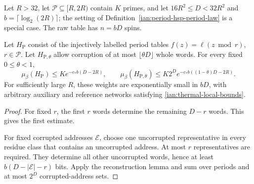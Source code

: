 \begin{proposition}
\label{ian:thermal-period-raw-obstruction}
Let \(R>32\), let \(\mathcal P\subseteq[R,2R)\) contain \(K\) primes,
and let
\(16R^2\le D<32R^2\) and \(b=\lceil\log_2(2R)\rceil\); the setting of
Definition~\ref{ian:period-hsp-period-law} is a special case.
The raw table has \(n=bD\) spins.

Let \(H_{\mathrm P}\) consist of the injectively labelled period
tables \(f(z)=\ell(z\bmod r)\), \(r\in\mathcal P\). Let
\(H_{\mathrm P,\theta}\) allow corruption of at most
\(\lfloor\theta D\rfloor\) whole words. For every fixed
\(0\le\theta<1\),
\[
 \mu_\beta(H_{\mathrm P})
 \le K e^{-c_*b(D-2R)},
 \qquad
 \mu_\beta(H_{\mathrm P,\theta})
 \le K2^D e^{-c_*b((1-\theta)D-2R)}.
 \tag{36.7}\label{ian:thermal-period-raw-mass}
\]
For sufficiently large \(R\), these weights are exponentially small
in \(bD\), with arbitrary auxiliary and reference networks satisfying
\eqref{ian:thermal-local-bounds}.
\end{proposition}

\begin{proof}
For fixed \(r\), the first \(r\) words determine the remaining
\(D-r\) words. This gives the first estimate.

For fixed corrupted addresses \(\mathcal E\), choose one uncorrupted
representative in every residue class that contains an uncorrupted
address. At most \(r\) representatives are required. They determine
all other uncorrupted words, hence at least
\(b(D-|\mathcal E|-r)\) bits. Apply the reconstruction lemma and sum over
periods and at most \(2^D\) corrupted-address sets.
\end{proof}

